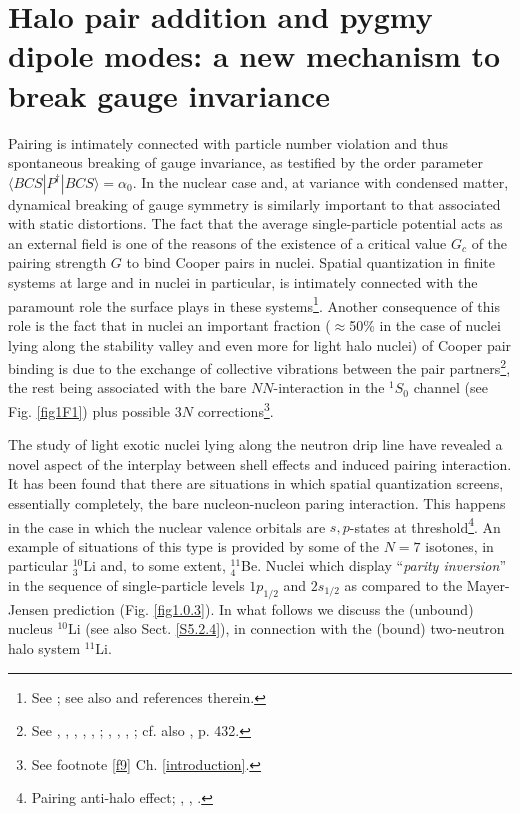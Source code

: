 \section[Halo pair addition mode and pygmy]{Halo pair addition and pygmy dipole modes: a new mechanism to break gauge invariance}\label{App1AF}
Pairing is intimately connected with particle number violation and thus spontaneous breaking of gauge invariance, as testified by the order parameter\\ \mbox{$\langle BCS|P^{\dagger}|BCS\rangle=\alpha_0$}.  In the nuclear case and, at variance with condensed matter, dynamical breaking of gauge symmetry is similarly important to that associated with static distortions. The fact that the average single-particle potential acts as an external field  is one of the reasons of the existence of a critical value $G_c$ of the pairing strength $G$ to bind Cooper pairs in nuclei. Spatial quantization in finite systems at large and in nuclei in particular, is intimately connected with the paramount role the surface plays in these systems\footnote{See \cite{Bohr:75}; see also \cite{Broglia:02d} and references therein.}. Another consequence of this role is  the fact that in nuclei an important fraction ($\approx$50\% in the case of nuclei lying along the stability valley and even more for light halo nuclei) of Cooper pair binding is due to the exchange of collective vibrations between the  pair partners\footnote{\label{f53C3} See \cite{Barranco:99}, \cite{Terasaki:02a}, \cite{Brink:05}, \cite{Saperstein:12}, \cite{Avdenkov:12}, \cite{Lombardo:12};  \cite{Barranco:01}, \cite{Potel:10}, \cite{Pankratov:11}, \citet{Barranco:99}; cf. also \cite{Bohr:75}, p. 432.}, the rest being associated with the bare $NN$-interaction in the $^1S_0$ channel (see Fig. \ref{fig1F1}) plus possible $3N$ corrections\footnote{See footnote \ref{f9} Ch. \ref{introduction}.}. 


The study of light exotic nuclei lying along the neutron drip line have revealed a novel aspect of the interplay between shell effects and induced pairing interaction. It has been found  that there are situations in which spatial quantization screens, essentially completely, the bare nucleon-nucleon paring interaction. This happens in the case in which the nuclear valence orbitals are $s,p$-states at threshold\footnote{Pairing anti-halo effect; \cite{Bennaceur:00} 
, \cite{Hamamoto:03}, \cite{Hamamoto:04}.}. An example of situations of this type is provided by some of the $N=7$ isotones, in particular $^{10}_3$Li and, to some extent, $^{11}_4$Be. Nuclei which display ``\textit{parity inversion}'' in the sequence of single-particle levels $1p_{1/2}$ and $2s_{1/2}$ as compared to the Mayer-Jensen prediction (Fig. \ref{fig1.0.3}).
 In what follows we discuss the (unbound) nucleus $^{10}$Li (see also Sect. \ref{S5.2.4}), in connection with the (bound) two-neutron halo system $^{11}$Li.
 
